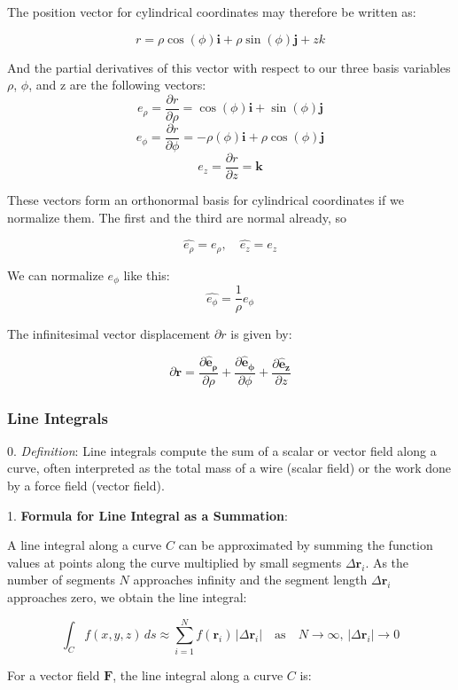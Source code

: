 \documentclass[12pt]{article}
\begin{document}
The position vector for cylindrical coordinates may therefore be written as:

\[r = \rho\cos(\phi)\textbf{i} + \rho\sin(\phi)\textbf{j} + zk\]

And the partial derivatives of this vector with respect to our three basis variables \(\rho\), \(\phi\), and z are the following vectors:
\[e_\rho = \frac{\partial r}{\partial \rho} = \cos(\phi)\textbf{i} + \sin(\phi)\textbf{j}\]
\[e_\phi = \frac{\partial r}{\partial \phi} = -\rho(\phi)\textbf{i} + \rho\cos(\phi)\textbf{j}\]
\[e_z = \frac{\partial r}{\partial z} = \textbf{k}\]

These vectors form an orthonormal basis for cylindrical coordinates if we normalize them. The first and the third are normal already, so 

\[\hat{e_\rho} = e_\rho, \quad \hat{e_z} = e_z\]

We can normalize \(e_\phi\) like this: 
\[\hat{e_\phi} = \frac{1}{\rho}e_\phi\]

The infinitesimal vector displacement \(\partial r\) is given by: 

\[
\partial \mathbf{r} = \frac{\partial \mathbf{\hat{e}_\rho}}{\partial \rho} + \frac{\partial \mathbf{\hat{e}_\phi}}{\partial \phi} + \frac{\partial \mathbf{\hat{e}_z}}{\partial z}
\]


\subsubsection{Line Integrals}

0. \textit{Definition}: Line integrals compute the sum of a scalar or vector field along a curve, often interpreted as the total mass of a wire (scalar field) or the work done by a force field (vector field).

1. \textbf{Formula for Line Integral as a Summation}:

A line integral along a curve \( C \) can be approximated by summing the function values at points along the curve multiplied by small segments \( \Delta \mathbf{r}_i \). As the number of segments \( N \) approaches infinity and the segment length \( \Delta \mathbf{r}_i \) approaches zero, we obtain the line integral:

\[
\int_C f(x, y, z) \, ds \approx \sum_{i=1}^N f(\mathbf{r}_i) \, |\Delta \mathbf{r}_i| \quad \text{as} \quad N \to \infty, \, |\Delta \mathbf{r}_i| \to 0
\]

For a vector field \(\mathbf{F}\), the line integral along a curve \( C \) is:
\end{document}
